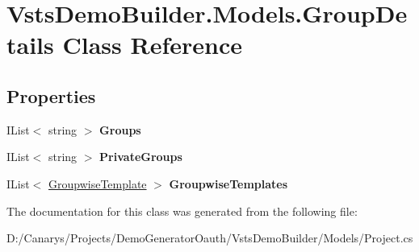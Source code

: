 \hypertarget{class_vsts_demo_builder_1_1_models_1_1_group_details}{}\section{Vsts\+Demo\+Builder.\+Models.\+Group\+Details Class Reference}
\label{class_vsts_demo_builder_1_1_models_1_1_group_details}
\subsection*{Properties}
\begin{DoxyCompactItemize}
\item 
\mbox{\label{class_vsts_demo_builder_1_1_models_1_1_group_details_a9140b302a4b84f5c2795e24abfa0da07}} 
I\+List$<$ string $>$ {\bfseries Groups}
\item 
\mbox{\label{class_vsts_demo_builder_1_1_models_1_1_group_details_ad6e7527fcd0f3a9754ee51825290987f}} 
I\+List$<$ string $>$ {\bfseries Private\+Groups}
\item 
\mbox{\label{class_vsts_demo_builder_1_1_models_1_1_group_details_a8a1a6e2d5ab2404e1109c763a47edf9b}} 
I\+List$<$ \mbox{\hyperlink{class_vsts_demo_builder_1_1_models_1_1_groupwise_template}{Groupwise\+Template}} $>$ {\bfseries Groupwise\+Templates}
\end{DoxyCompactItemize}


The documentation for this class was generated from the following file\+:\begin{DoxyCompactItemize}
\item 
D\+:/\+Canarys/\+Projects/\+Demo\+Generator\+Oauth/\+Vsts\+Demo\+Builder/\+Models/Project.\+cs\end{DoxyCompactItemize}
